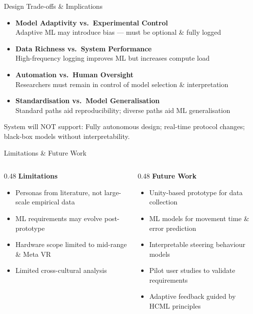 \documentclass[aspectratio=169, 10pt]{beamer}
\begin{document}
\begin{frame}{Design Trade-offs \& Implications}
  \begin{itemize}
    \item \textbf{Model Adaptivity vs.\ Experimental Control}\\
          Adaptive ML may introduce bias --- must be optional \& fully logged
    \item \textbf{Data Richness vs.\ System Performance}\\
          High-frequency logging improves ML but increases compute load
    \item \textbf{Automation vs.\ Human Oversight}\\
          Researchers must remain in control of model selection \& interpretation
    \item \textbf{Standardisation vs.\ Model Generalisation}\\
          Standard paths aid reproducibility; diverse paths aid ML generalisation
  \end{itemize}

  \vspace{0.5em}
  \alert{System will NOT support:} Fully autonomous design; real-time protocol changes; black-box models without interpretability.
\end{frame}

\begin{frame}{Limitations \& Future Work}
  \begin{columns}[T]
    \begin{column}{0.48\textwidth}
      \textbf{Limitations}
      \begin{itemize}
        \item Personas from literature, not large-scale empirical data
        \item ML requirements may evolve post-prototype
        \item Hardware scope limited to mid-range \& Meta VR
        \item Limited cross-cultural analysis
      \end{itemize}
    \end{column}
    \begin{column}{0.48\textwidth}
      \textbf{Future Work}
      \begin{itemize}
        \item Unity-based prototype for data collection
        \item ML models for movement time \& error prediction
        \item Interpretable steering behaviour models
        \item Pilot user studies to validate requirements
        \item Adaptive feedback guided by HCML principles
      \end{itemize}
    \end{column}
  \end{columns}
\end{frame}
\end{document}
